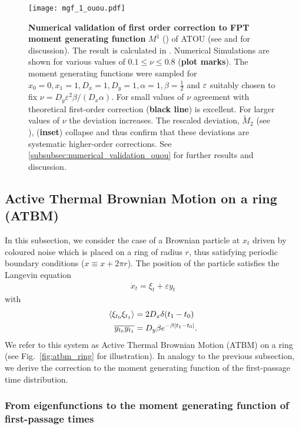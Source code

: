 \documentclass[%
 reprint,
superscriptaddress,
nofootinbib,
 amsmath,amssymb,
 aps,
prx,
]{revtex4-2}
\begin{document}
\begin{figure}
\texttt{[image: mgf\_1\_ouou.pdf]}
\caption{\textbf{Numerical validation of first order correction to FPT moment generating function} $M^1$ (\cf {}) of ATOU (see  and  for discussion). The result is calculated in . Numerical Simulations are shown for various values of $0.1 \leq \nu \leq 0.8$  (\textbf{plot marks}). The moment generating functions were sampled for $x_0=0, x_1 = 1, D_x = 1, D_y = 1, \alpha = 1, \beta = \frac{1}{2}$ and $\varepsilon$ suitably chosen to fix $\nu = D_y \varepsilon^2 \beta /(D_x \alpha)$. For small values of $\nu$ agreement with theoretical first-order correction (\textbf{black line}) is excellent. For larger values of $\nu$ the deviation  increases. The rescaled deviation, $\tilde{M}_2$ (see ), (\textbf{inset}) collapse and thus confirm that these deviations are systematic higher-order corrections. See \eqref{subsubsec:numerical_validation_ouou} for further results and discussion.}
\label{fig:ouou_m1}
\end{figure}


\subsection{Active Thermal Brownian Motion on a ring (ATBM)}
\label{subsec:BMOU}
In this subsection, we consider the case of a Brownian particle at $x_t$ driven by coloured noise which is placed on a ring of radius $r$, thus satisfying periodic boundary conditions ($x \equiv x + 2 \pi r$).
The position of the particle satisfies the Langevin equation
\begin{align}
	\dot{x}_t = \xi_t + \varepsilon y_t
	\label{eq:bmou_sde}
\end{align}
with
\begin{align}
	\left\langle {\xi_{t_0} \xi_{t_1}} \right\rangle &= 2 D_x \delta(t_1-t_0) \\
	\overline{y_{t_0} y_{t_1}} &= D_y \beta e^{-\beta|t_1-t_0|}.
\end{align}
We refer to this system as Active Thermal Brownian Motion  (ATBM) on a ring (see Fig.~\ref{fig:atbm_ring} for illustration).
In analogy to the previous subsection, we derive the correction to the moment generating function of the first-passage time distribution.



\subsubsection{From eigenfunctions to the moment generating function of first-passage times}
\end{document}
